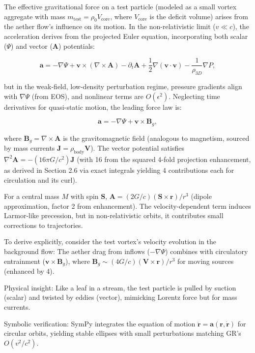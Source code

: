 The effective gravitational force on a test particle (modeled as a small vortex aggregate with mass $m_{\text{test}} = \rho_0 V_{\text{core}}$, where $V_{\text{core}}$ is the deficit volume) arises from the aether flow's influence on its motion. In the non-relativistic limit ($v \ll c$), the acceleration derives from the projected Euler equation, incorporating both scalar ($\Psi$) and vector ($\mathbf{A}$) potentials:

\[
\mathbf{a} = -\nabla \Psi + \mathbf{v} \times (\nabla \times \mathbf{A}) - \partial_t \mathbf{A} + \frac{1}{2} \nabla (\mathbf{v} \cdot \mathbf{v}) - \frac{1}{\rho_{3D}} \nabla P,
\]

but in the weak-field, low-density perturbation regime, pressure gradients align with $\nabla \Psi$ (from EOS), and nonlinear terms are $O(\epsilon^2)$. Neglecting time derivatives for quasi-static motion, the leading force law is:

\[
\mathbf{a} = -\nabla \Psi + \mathbf{v} \times \mathbf{B}_g,
\]

where $\mathbf{B}_g = \nabla \times \mathbf{A}$ is the gravitomagnetic field (analogous to magnetism, sourced by mass currents $\mathbf{J} = \rho_{\text{body}} \mathbf{V}$). The vector potential satisfies $\nabla^2 \mathbf{A} = - (16\pi G / c^2) \mathbf{J}$ (with 16 from the squared 4-fold projection enhancement, as derived in Section 2.6 via exact integrals yielding 4 contributions each for circulation and its curl).

For a central mass $M$ with spin $\mathbf{S}$, $\mathbf{A} = (2 G / c) (\mathbf{S} \times \mathbf{r}) / r^3$ (dipole approximation, factor 2 from enhancement). The velocity-dependent term induces Larmor-like precession, but in non-relativistic orbits, it contributes small corrections to trajectories.

To derive explicitly, consider the test vortex's velocity evolution in the background flow: The aether drag from inflows ($-\nabla \Psi$) combines with circulatory entrainment ($\mathbf{v} \times \mathbf{B}_g$), where $\mathbf{B}_g \sim (4 G / c) (\mathbf{V} \times \mathbf{r}) / r^3$ for moving sources (enhanced by 4).

Physical insight: Like a leaf in a stream, the test particle is pulled by suction (scalar) and twisted by eddies (vector), mimicking Lorentz force but for mass currents.

Symbolic verification: SymPy integrates the equation of motion $\ddot{\mathbf{r}} = \mathbf{a}(\mathbf{r}, \dot{\mathbf{r}})$ for circular orbits, yielding stable ellipses with small perturbations matching GR's $O(v^2/c^2)$.

